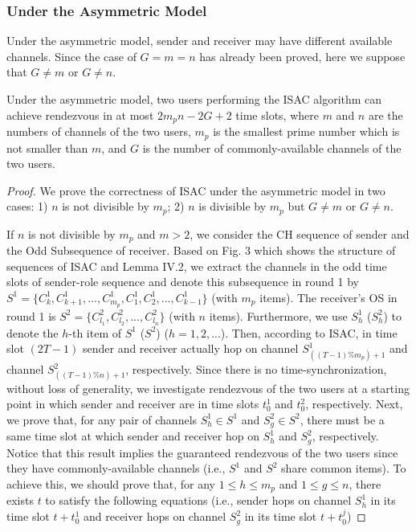 \documentclass[journal]{IEEEtran}
\begin{document}
\subsubsection{Under the Asymmetric Model}
Under the asymmetric model, sender and receiver may have different available channels. Since the case of $G=m=n$ has already been proved, here we suppose that $G\neq m$ or $G\neq n$.
\begin{theoremn}
Under the asymmetric model, two users performing the ISAC algorithm can achieve rendezvous in at most $2m_pn-2G+2$ time slots, where $m$ and $n$ are the numbers of channels of the two users, $m_p$ is the smallest prime number which is not smaller than $m$, and $G$ is the number of commonly-available channels of the two users.
\end{theoremn}
\begin{proof}
We prove the correctness of ISAC under the asymmetric model in two cases: 1) $n$ is not divisible by $m_p$; 2) $n$ is divisible by $m_p$ but $G\neq m$ or $G\neq n$.
\par If $n$ is not divisible by $m_p$ and $m>2$, we consider the CH sequence of sender and the Odd Subsequence of receiver. Based on Fig. 3 which shows the structure of sequences of ISAC and Lemma IV.2, we extract the channels in the odd time slots of sender-role sequence and denote this subsequence in round 1 by $S^1=\{C_k^1,C_{k+1}^1, ...,C_{m_p}^1, C_1^1, C_2^1, ..., C_{k-1}^1\}$ (with $m_p$ items). The receiver's OS in round 1 is $S^2=\{C_{l_1}^2, C_{l_2}^2, ..., C_{l_n}^2\}$ (with $n$ items). Furthermore, we use $S_h^1$ ($S_h^2$) to denote the $h\text{-}$th item of $S^1$ ($S^2$) ($h=1, 2, ...$). Then, according to ISAC, in time slot $(2T-1)$ sender and receiver actually hop on channel $S_{((T-1)\%m_p)+1}^1$ and channel $S_{((T-1)\%n)+1}^2$, respectively. Since there is no time-synchronization, without loss of generality, we investigate rendezvous of the two users at a starting point in which sender and receiver are in time slots $t_0^1$ and $t_0^2$, respectively. Next, we prove that, for any pair of channels $S_h^1\in S^1$ and $S_g^2\in S^2$, there must be a same time slot at which sender and receiver hop on $S_h^1$ and $S_g^2$, respectively. Notice that this result implies the guaranteed rendezvous of the two users since they have commonly-available channels (i.e., $S^1$ and $S^2$ share common items). To achieve this, we should prove that, for any $1\leq h\leq m_p$ and $1\leq g\leq n$, there exists $t$ to satisfy the following equations (i.e., sender hops on channel $S_h^1$ in its time slot $t+t_0^1$ and receiver hops on channel $S_g^2$ in its time slot $t+t_0^j$)

\end{proof}
\end{document}
